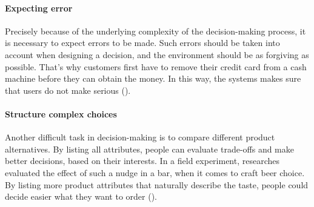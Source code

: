 \paragraph{Expecting error}
Precisely because of the underlying complexity of the decision-making process, it is necessary to expect errors to be made. Such errors should be taken into account when designing a decision, and the environment should be as forgiving as possible. That's why customers first have to remove their credit card from a cash machine before they can obtain the money. In this way, the systems makes sure that users do not make serious (\cite{weinmann_digital_2016}).
\paragraph{Structure complex choices}
Another difficult task in decision-making is to compare different product alternatives. By listing all attributes, people can evaluate trade-offs and make better decisions, based on their interests. In a field experiment, researches evaluated the effect of such a nudge in a bar, when it comes to craft beer choice. By listing more product attributes that naturally describe the taste, people could decide easier what they want to order (\cite{malone_excessive_2017}).


